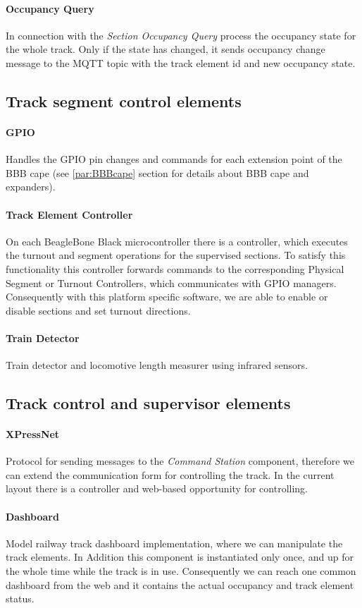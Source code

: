 \paragraph{Occupancy Query}
In connection with the \textit{Section Occupancy Query} process the occupancy state for the whole track. Only if the state has changed, it sends occupancy change message to the MQTT topic with the track element id and new occupancy state.

\subsection{Track segment control elements}
\paragraph{GPIO}
Handles the GPIO pin changes and commands for each extension point of the BBB cape (see \ref{par:BBBcape} section for details about BBB cape and expanders).
\paragraph{Track Element Controller}
On each BeagleBone Black microcontroller there is a controller, which executes the turnout and segment operations for the supervised sections. To satisfy this functionality this controller forwards commands to the corresponding Physical Segment or Turnout Controllers, which communicates with GPIO managers. Consequently with this platform specific software, we are able to enable or disable sections and set turnout directions.
\paragraph{Train Detector}
Train detector and locomotive length measurer using infrared sensors.

\subsection{Track control and supervisor elements}
\paragraph{XPressNet}
Protocol for sending messages to the \textit{Command Station} component, therefore we can extend the communication form for controlling the track. In the current layout there is a controller and web-based opportunity for controlling.
\paragraph{Dashboard}
Model railway track dashboard implementation, where we can manipulate the track elements. In Addition this component is instantiated only once, and up for the whole time while the track is in use. Consequently we can reach one common dashboard from the web and it contains the actual occupancy and track element status.
